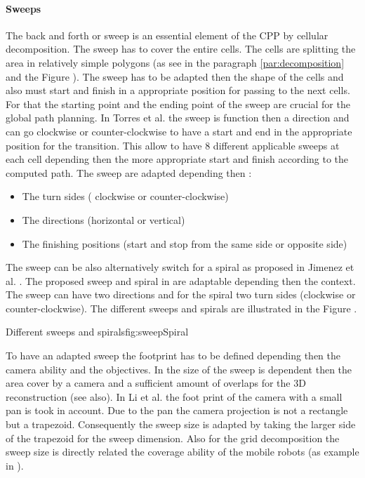  \paragraph*{Sweeps} \label{par:sweep}
	The back and forth or sweep is an essential element of the CPP by cellular decomposition. The sweep has to cover the entire cells. The cells are splitting the area in relatively simple polygons (as see in the paragraph \ref{par:decomposition} and  the Figure ). The sweep has to be adapted then the shape of the cells and also must start and finish in a appropriate position for passing to the next cells.
	For that the starting point and the ending point of the sweep are crucial for the global path planning.
	In Torres et al. \cite{144*torres2016}  the sweep is function then a direction and can go clockwise or counter-clockwise to have a start and end in the appropriate position for the transition. 
	 This allow to have 8 different applicable sweeps at each cell depending then the more appropriate start and finish  according to the computed path. The sweep are adapted depending then : 
	 \begin{itemize}
	 \item The turn sides ( clockwise or counter-clockwise)
	 \item The directions (horizontal or vertical)
	 \item The finishing  positions (start and stop from the same side or opposite side)
\end{itemize}	
	 The sweep can be also alternatively switch for a spiral as proposed in Jimenez et al. \citep{217*jimenez2007}. The proposed sweep and spiral in  \citep{217*jimenez2007}  are adaptable depending then the context. The sweep can have two directions and for the spiral two turn sides (clockwise or counter-clockwise).  The different sweeps and spirals are illustrated in the Figure . 
	  \begin{mfigures}[!]{Different sweeps and spirals}{fig:sweepSpiral} \centering
{}
\end{mfigures} 

	To have an adapted sweep the footprint has to be defined depending then the camera ability and the objectives. In \cite{144*torres2016} the size of the sweep is dependent then the area cover by a camera and a sufficient amount of overlaps for the 3D reconstruction (see also\citep{191*di2016}). In Li et al.  \citep{146*li2011} the foot print of the camera with a small pan is took in account. Due to the pan the camera projection is not a rectangle but a trapezoid. Consequently the sweep size is adapted by taking the larger side of the trapezoid for the sweep dimension.
	Also for the grid decomposition the sweep size is directly related the coverage ability of the mobile robots (as example in \citep{215*lee2010,195*choi2009}).  %
	
